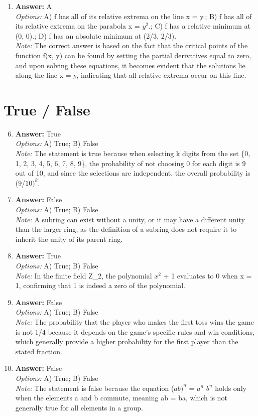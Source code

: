 \documentclass[12pt]{article}
\begin{document}
\begin{enumerate}[label=\arabic*.]
\item \textbf{Answer:} A
\\ \textit{Options:} A) f has all of its relative extrema on the line x = y.; B) f has all of its relative extrema on the parabola x = $y^2$.; C) f has a relative minimum at (0, 0).; D) f has an absolute minimum at (2/3, 2/3).
\\ \textit{Note:} The correct answer is based on the fact that the critical points of the function f(x, y) can be found by setting the partial derivatives equal to zero, and upon solving these equations, it becomes evident that the solutions lie along the line x = y, indicating that all relative extrema occur on this line.
\end{enumerate}

\section*{True / False}
\begin{enumerate}[label=\arabic*.]
\setcounter{enumi}{5}
\item \textbf{Answer:} True
\\ \textit{Options:} A) True; B) False
\\ \textit{Note:} The statement is true because when selecting k digits from the set \{0, 1, 2, 3, 4, 5, 6, 7, 8, 9\}, the probability of not choosing 0 for each digit is 9 out of 10, and since the selections are independent, the overall probability is (9/$10)^k$.
\item \textbf{Answer:} False
\\ \textit{Options:} A) True; B) False
\\ \textit{Note:} A subring can exist without a unity, or it may have a different unity than the larger ring, as the definition of a subring does not require it to inherit the unity of its parent ring.
\item \textbf{Answer:} True
\\ \textit{Options:} A) True; B) False
\\ \textit{Note:} In the finite field Z\_2, the polynomial $x^2$ + 1 evaluates to 0 when x = 1, confirming that 1 is indeed a zero of the polynomial.
\item \textbf{Answer:} False
\\ \textit{Options:} A) True; B) False
\\ \textit{Note:} The probability that the player who makes the first toss wins the game is not 1/4 because it depends on the game's specific rules and win conditions, which generally provide a higher probability for the first player than the stated fraction.
\item \textbf{Answer:} False
\\ \textit{Options:} A) True; B) False
\\ \textit{Note:} The statement is false because the equation ($ab)^n$ = $a^n$ $b^n$ holds only when the elements a and b commute, meaning ab = ba, which is not generally true for all elements in a group.
\end{enumerate}
\end{document}
